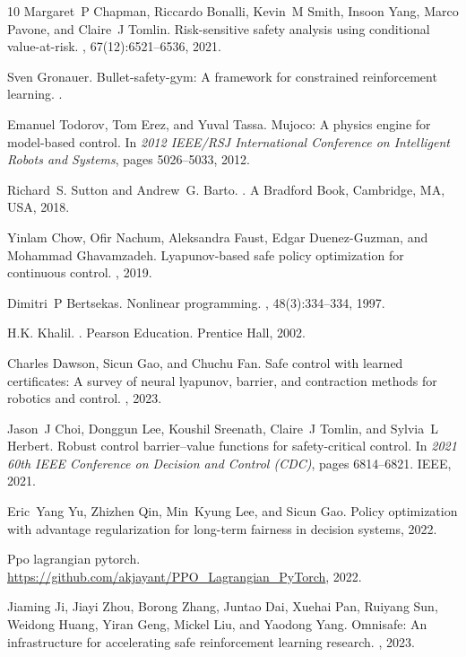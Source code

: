 \documentclass{article}
\theoremstyle{definition}
\begin{document}
\begin{thebibliography}{10}
Margaret~P Chapman, Riccardo Bonalli, Kevin~M Smith, Insoon Yang, Marco Pavone, and Claire~J Tomlin.
\newblock Risk-sensitive safety analysis using conditional value-at-risk.
, 67(12):6521--6536, 2021.

Sven Gronauer.
\newblock Bullet-safety-gym: A framework for constrained reinforcement learning.
.

Emanuel Todorov, Tom Erez, and Yuval Tassa.
\newblock Mujoco: A physics engine for model-based control.
\newblock In {\em 2012 IEEE/RSJ International Conference on Intelligent Robots and Systems}, pages 5026--5033, 2012.

Richard~S. Sutton and Andrew~G. Barto.
.
\newblock A Bradford Book, Cambridge, MA, USA, 2018.

Yinlam Chow, Ofir Nachum, Aleksandra Faust, Edgar Duenez-Guzman, and Mohammad Ghavamzadeh.
\newblock Lyapunov-based safe policy optimization for continuous control.
, 2019.

Dimitri~P Bertsekas.
\newblock Nonlinear programming.
, 48(3):334--334, 1997.

H.K. Khalil.
.
\newblock Pearson Education. Prentice Hall, 2002.

Charles Dawson, Sicun Gao, and Chuchu Fan.
\newblock Safe control with learned certificates: A survey of neural lyapunov, barrier, and contraction methods for robotics and control.
, 2023.

Jason~J Choi, Donggun Lee, Koushil Sreenath, Claire~J Tomlin, and Sylvia~L Herbert.
\newblock Robust control barrier--value functions for safety-critical control.
\newblock In {\em 2021 60th IEEE Conference on Decision and Control (CDC)}, pages 6814--6821. IEEE, 2021.

Eric~Yang Yu, Zhizhen Qin, Min~Kyung Lee, and Sicun Gao.
\newblock Policy optimization with advantage regularization for long-term fairness in decision systems, 2022.

Ppo lagrangian pytorch.
\newblock \url{https://github.com/akjayant/PPO_Lagrangian_PyTorch}, 2022.

Jiaming Ji, Jiayi Zhou, Borong Zhang, Juntao Dai, Xuehai Pan, Ruiyang Sun, Weidong Huang, Yiran Geng, Mickel Liu, and Yaodong Yang.
\newblock Omnisafe: An infrastructure for accelerating safe reinforcement learning research.
, 2023.

\end{thebibliography}
\end{document}
